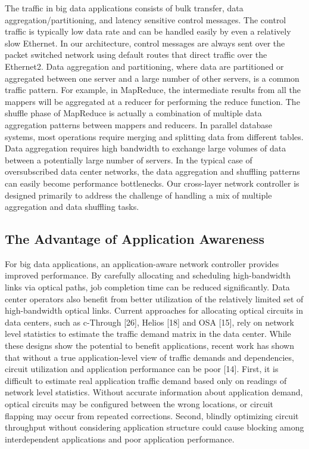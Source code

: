 \documentclass[runningheads,a4paper]{llncs}
\begin{document}
The traffic in big data applications consists of bulk transfer, data aggregation/partitioning, and latency sensitive control messages. The control traffic is typically low data rate and can be handled easily by even a relatively slow Ethernet. In our architecture, control messages are always sent over the packet switched network using default routes that direct traffic over the Ethernet2.
Data aggregation and partitioning, where data are partitioned or aggregated between one server and a large number of other servers, is a common traffic pattern. For example, in MapReduce, the intermediate results from all the mappers will be aggregated at a reducer for performing the reduce function. The shuffle phase of MapReduce is actually a combination of multiple data aggregation patterns between mappers and reducers. In parallel database systems, most operations require merging and splitting data from different tables. Data aggregation requires high bandwidth to exchange large volumes of data between a potentially large number of servers. In the typical case of oversubscribed data center networks, the data aggregation and shuffling patterns can easily become performance bottlenecks. Our cross-layer network controller is designed primarily to address the challenge of handling a mix of multiple aggregation and data shuffling tasks.

\subsection{The Advantage of Application Awareness}
For big data applications, an application-aware network controller provides improved performance. By carefully allocating and scheduling high-bandwidth links via optical paths, job completion time can be reduced significantly. Data center operators also benefit from better utilization of the relatively limited set of high-bandwidth optical links.
Current approaches for allocating optical circuits in data centers, such as c-Through [26], Helios [18] and OSA [15], rely on network level statistics to estimate the traffic demand matrix in the data center. While these designs show the potential to benefit applications, recent work has shown that without a true application-level view of traffic demands and dependencies, circuit utilization and application performance can be poor [14]. First, it is difficult to estimate real application traffic demand based only on readings of network level statistics. Without accurate information about application demand, optical circuits may be configured between the wrong locations, or circuit flapping may occur from repeated corrections. Second, blindly optimizing circuit throughput without considering application structure could cause blocking among interdependent applications and poor application performance.
\end{document}
